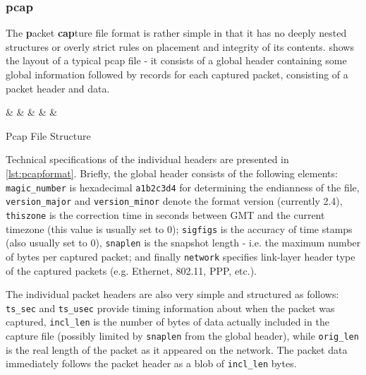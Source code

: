 \tocless\subsubsection{pcap}
\label{sec:formats:pcap}
The \textbf{p}acket \textbf{cap}ture file format is rather simple in that it has no deeply nested structures or
overly strict rules on placement and integrity of its contents.  shows the layout of a
typical pcap file - it consists of a global header containing some global information followed by records for
each captured packet, consisting of a packet header and data.

\begin{listing}[h]
\centering
\begin{bytefield}[boxformatting={\centering\tiny}]{32}
 &
 &
 &
 &
 &
\end{bytefield}
\caption{Pcap File Structure}
\label{lst:pcapfile}
\end{listing}

Technical specifications of the individual headers are presented in \cref{lst:pcapformat}. 
Briefly, the global header consists of the following elements:
\texttt{magic\_number} is hexadecimal \texttt{a1b2c3d4} for determining the endianness of the file,
\texttt{version\_major} and \texttt{version\_minor} denote the format version (currently 2.4),
\texttt{thiszone} is the correction time in seconds between GMT and the current timezone (this value is
usually set to 0); \texttt{sigfigs} is the accuracy of time stamps (also usually set to 0), \texttt{snaplen} is
the snapshot length - i.e. the maximum number of bytes per captured packet; and finally \texttt{network}
specifies link-layer header type of the captured packets (e.g. Ethernet, 802.11, PPP, etc.).

The individual packet headers are also very simple and structured as follows:
\texttt{ts\_sec} and \texttt{ts\_usec} provide timing information about when the packet was captured,
\texttt{incl\_len} is the number of bytes of data actually included in the capture file (possibly
limited by \texttt{snaplen} from the global header), while \texttt{orig\_len} is the
real length of the packet as it appeared on the network.
The packet data immediately follows the packet header as a blob of \texttt{incl\_len} bytes.


